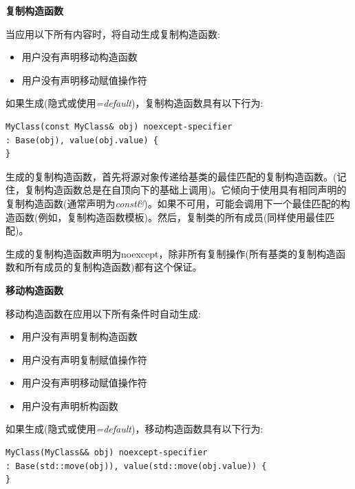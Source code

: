 \hspace*{\fill} \par %
\textbf{复制构造函数}

当应用以下所有内容时，将自动生成复制构造函数:\par

\begin{itemize}
	\item 用户没有声明移动构造函数
	\item 用户没有声明移动赋值操作符
\end{itemize}

如果生成(隐式或使用\textit{=default})，复制构造函数具有以下行为:\par

\begin{lstlisting}[caption={}]
MyClass(const MyClass& obj) noexcept-specifier
: Base(obj), value(obj.value) {
}
\end{lstlisting}

生成的复制构造函数，首先将源对象传递给基类的最佳匹配的复制构造函数。(记住，复制构造函数总是在自顶向下的基础上调用)。它倾向于使用具有相同声明的复制构造函数(通常声明为\textit{const\&})。如果不可用，可能会调用下一个最佳匹配的构造函数(例如，复制构造函数模板)。然后，复制类的所有成员(同样使用最佳匹配)。\par

生成的复制构造函数声明为noexcept，除非所有复制操作(所有基类的复制构造函数和所有成员的复制构造函数)都有这个保证。\par

\hspace*{\fill} \par %
\textbf{移动构造函数}

移动构造函数在应用以下所有条件时自动生成:\par

\begin{itemize}
	\item 用户没有声明复制构造函数
	\item 用户没有声明复制赋值操作符
	\item 用户没有声明移动赋值操作符
	\item 用户没有声明析构函数
\end{itemize}

如果生成(隐式或使用\textit{=default})，移动构造函数具有以下行为:\par

\begin{lstlisting}[caption={}]
MyClass(MyClass&& obj) noexcept-specifier
: Base(std::move(obj)), value(std::move(obj.value)) {
}
\end{lstlisting}

